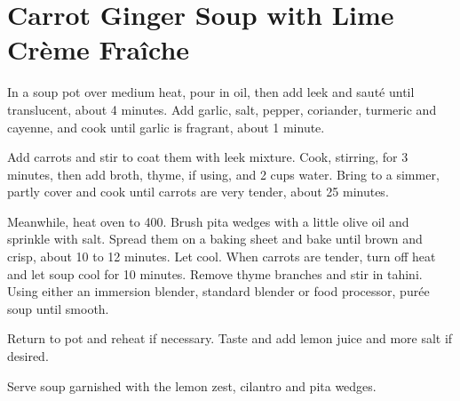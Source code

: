\section{Carrot Ginger Soup with Lime Cr\`{e}me Fra\^{i}che}
\begin{recipe}





	In a soup pot over medium heat, pour in oil, then add leek and sauté until translucent, about 4 minutes. Add garlic, salt, pepper, coriander, turmeric and cayenne, and cook until garlic is fragrant, about 1 minute.

	Add carrots and stir to coat them with leek mixture. Cook, stirring, for 3 minutes, then add broth, thyme, if using, and 2 cups water. Bring to a simmer, partly cover and cook until carrots are very tender, about 25 minutes.

	Meanwhile, heat oven to 400. Brush pita wedges with a little olive oil and sprinkle with salt. Spread them on a baking sheet and bake until brown and crisp, about 10 to 12 minutes. Let cool.
	When carrots are tender, turn off heat and let soup cool for 10 minutes. Remove thyme branches and stir in tahini. Using either an immersion blender, standard blender or food processor, purée soup until smooth.

	Return to pot and reheat if necessary. Taste and add lemon juice and more salt if desired.

	Serve soup garnished with the lemon zest, cilantro and pita wedges.



\end{recipe}

